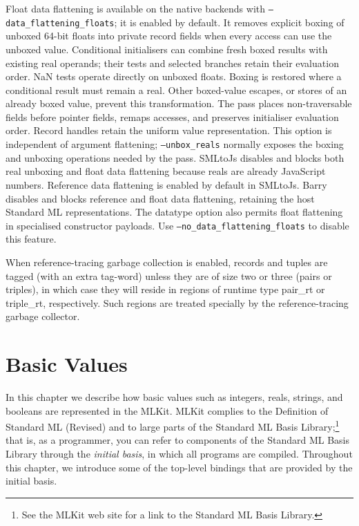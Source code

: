 \documentclass[12pt]{book}
\begin{document}
Float data flattening is available on the native backends with
\texttt{--data\_flattening\_floats}; it is enabled by default.
It removes explicit boxing of unboxed 64-bit floats into private record fields
when every access can use the unboxed value. Conditional initialisers can
combine fresh boxed results with existing real operands; their tests and
selected branches retain their evaluation order. NaN tests operate directly
on unboxed floats. Boxing is restored where a conditional result must remain
a real. Other boxed-value escapes, or stores of an already boxed value,
prevent this transformation.
The pass places non-traversable fields before pointer fields, remaps accesses,
and preserves initialiser evaluation order. Record handles retain the uniform
value representation. This option is independent of argument flattening;
\texttt{--unbox\_reals} normally exposes the boxing and unboxing operations
needed by the pass. SMLtoJs disables and blocks both real unboxing and float
data flattening because reals are already JavaScript numbers. Reference data
flattening is enabled by default in SMLtoJs. Barry disables and blocks reference
and float data flattening, retaining the host Standard ML representations.
The datatype option also permits float flattening in
specialised constructor payloads. Use
\texttt{--no\_data\_flattening\_floats} to disable this feature.

When reference-tracing garbage collection is enabled, records and tuples are
tagged (with an extra tag-word) unless they are of size two or three (pairs or
triples), in which case they will reside in regions of runtime type {\sc
  pair\_rt} or {\sc triple\_rt}, respectively. Such regions are treated
specially by the reference-tracing garbage collector.

\chapter{Basic Values}
In this chapter we describe how basic values such as integers, reals,
strings, and booleans are represented in the MLKit. MLKit complies to
the Definition of Standard ML (Revised)
%
%
and to large parts of the Standard ML Basis Library;\footnote{See the MLKit web
site for a link to the Standard ML Basis Library.}
%
%
%
that is, as a programmer, you can refer to components of the Standard ML Basis
Library through the
%
%
{\em initial basis}, in which all programs are compiled.  Throughout this
chapter, we introduce some of the top-level bindings that are provided by the
initial basis.
\end{document}

